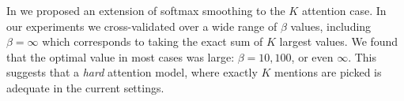 

In  we proposed an extension of softmax smoothing to the $K$ attention case. In our experiments 
we cross-validated over a wide range of $\beta$ values, including $\beta=\infty$ which corresponds to taking
the exact sum of $K$ largest values. We found that the optimal value in most cases was large: $\beta=10, 100$, or even $\infty$. This suggests that a {\em hard} attention model, where exactly $K$ mentions are picked is adequate in the current settings.




